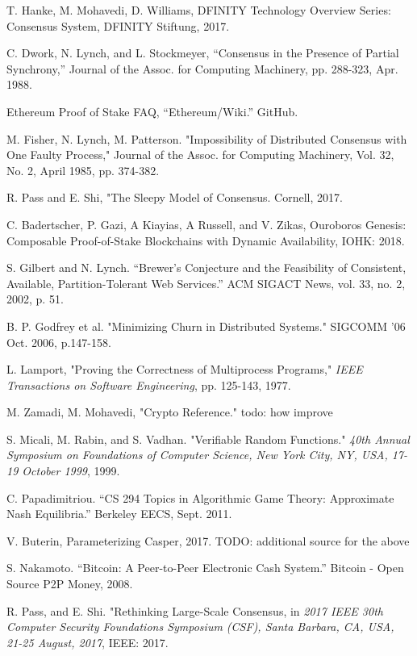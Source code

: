 \documentclass[10pt,journal,compsoc]{IEEEtran}
\begin{document}
\begin{thebibliography}{1}
  T. Hanke, M. Mohavedi, D. Williams, DFINITY Technology Overview Series: Consensus System, DFINITY Stiftung, 2017.

C. Dwork, N. Lynch, and L. Stockmeyer, “Consensus in the Presence of Partial Synchrony,” Journal of the Assoc. for Computing Machinery, pp. 288-323, Apr. 1988.

 Ethereum Proof of Stake FAQ, “Ethereum/Wiki.” GitHub.

 M. Fisher, N. Lynch, M. Patterson. "Impossibility of Distributed Consensus with One Faulty Process," Journal of the Assoc. for Computing Machinery, Vol. 32, No. 2, April 1985, pp. 374-382.

R. Pass and E. Shi, "The Sleepy Model of Consensus. Cornell, 2017.

 C. Badertscher, P. Gazi, A Kiayias, A Russell, and V. Zikas, Ouroboros Genesis: Composable Proof-of-Stake Blockchains with Dynamic Availability, IOHK: 2018.

 S. Gilbert and N. Lynch. “Brewer's Conjecture and the Feasibility of Consistent, Available, Partition-Tolerant Web Services.” ACM SIGACT News, vol. 33, no. 2, 2002, p. 51.

 B. P. Godfrey et al. "Minimizing Churn in Distributed Systems." SIGCOMM '06 Oct. 2006, p.147-158.

 L. Lamport, "Proving the Correctness of Multiprocess Programs," \emph{IEEE Transactions on Software Engineering}, pp. 125-143, 1977.

 M. Zamadi, M. Mohavedi, "Crypto Reference." todo: how improve

 S. Micali, M. Rabin, and S. Vadhan. "Verifiable Random Functions." \emph{40th Annual Symposium on Foundations of Computer Science, New York City, NY, USA, 17-19 October 1999}, 1999. 

 C. Papadimitriou. “CS 294 Topics in Algorithmic Game Theory: Approximate Nash Equilibria.” Berkeley EECS, Sept. 2011.

 V. Buterin, Parameterizing Casper, 2017.
TODO: additional source for the above

 S. Nakamoto. “Bitcoin: A Peer-to-Peer Electronic Cash System.” Bitcoin - Open Source P2P Money, 2008.

 R. Pass, and E. Shi. "Rethinking Large-Scale Consensus, in \emph{2017 IEEE 30th Computer Security Foundations Symposium (CSF), Santa Barbara, CA, USA, 21-25 August, 2017}, IEEE: 2017.


\end{thebibliography}
\end{document}
